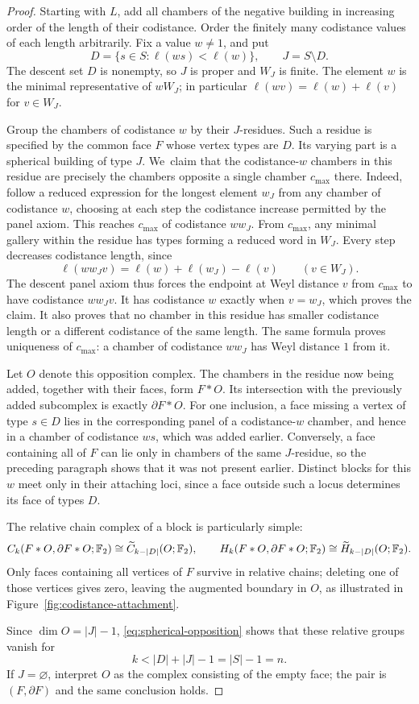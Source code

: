 \begin{proof}
Starting with $L$, add all chambers of the negative building in increasing
order of the length of their codistance. Order the finitely many
codistance values of each length arbitrarily. Fix a value $w\ne1$, and put
\[
 D=\{s\in S:\ell(ws)<\ell(w)\},\qquad J=S\setminus D.
\]
The descent set $D$ is nonempty, so $J$ is proper and $W_J$ is finite.
The element $w$ is the minimal representative of $wW_J$; in particular
$\ell(wv)=\ell(w)+\ell(v)$ for $v\in W_J$.

Group the chambers of codistance $w$ by their $J$-residues. Such a residue
is specified by the common face $F$ whose vertex types are $D$. Its
varying part is a spherical building of type $J$.
We~claim that the codistance-$w$ chambers in this residue are precisely
the chambers opposite a single chamber $c_{\max}$ there. Indeed, follow
a reduced expression for the longest element $w_J$ from any chamber of
codistance $w$, choosing at each step the codistance increase permitted
by the panel axiom. This reaches $c_{\max}$ of codistance $ww_J$.
From $c_{\max}$, any minimal gallery within the residue has types forming
a reduced word in $W_J$. Every step decreases codistance length, since
\[
 \ell(ww_Jv)=\ell(w)+\ell(w_J)-\ell(v)\qquad(v\in W_J).
\]
The descent panel axiom thus forces the endpoint at Weyl distance $v$
from $c_{\max}$ to have codistance $ww_Jv$. It has codistance $w$ exactly
when $v=w_J$, which proves the claim. It also proves that no chamber
in this residue has smaller codistance length or a different codistance
of the same length. The same formula proves uniqueness of $c_{\max}$:
a chamber of codistance $ww_J$ has Weyl distance $1$ from it.

Let $O$ denote this opposition complex. The chambers in the residue
now being added, together with their faces, form $F*O$. Its intersection
with the previously added subcomplex is exactly $\partial F*O$.
For one inclusion, a face missing a vertex of type $s\in D$ lies in the
corresponding panel of a codistance-$w$ chamber, and hence in a chamber
of codistance $ws$, which was added earlier. Conversely, a face
containing all of $F$ can lie only in chambers of the same $J$-residue,
so the preceding paragraph shows that it was not present earlier.
Distinct blocks for this $w$ meet only in their attaching loci, since
a face outside such a locus determines its face of types $D$.

The relative chain complex of a block is particularly simple:
\begin{equation}\label{eq:relative-chains}
 C_k(F*O,\partial F*O;\mathbb F_2)
 \cong \widetilde C_{k-|D|}(O;\mathbb F_2),
 \qquad
 H_k(F*O,\partial F*O;\mathbb F_2)
 \cong \widetilde H_{k-|D|}(O;\mathbb F_2).
\end{equation}
Only faces containing all vertices of $F$ survive in relative chains;
deleting one of those vertices gives zero, leaving the augmented
boundary in $O$, as illustrated in Figure~\ref{fig:codistance-attachment}.

Since $\dim O=|J|-1$, \eqref{eq:spherical-opposition}
shows that these relative groups vanish for
\[
 k<|D|+|J|-1=|S|-1=n.
\]
If $J=\varnothing$, interpret $O$ as the complex consisting of the empty
face; the pair is $(F,\partial F)$ and the same conclusion holds.


\end{proof}
